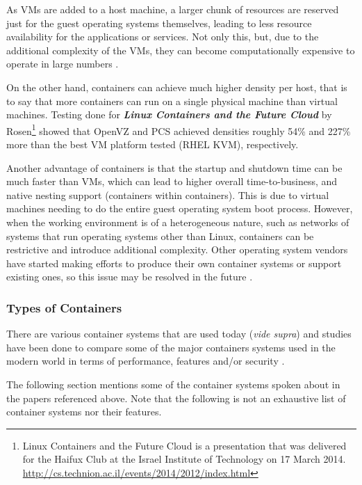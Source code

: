 As VMs are added to a host machine, a larger chunk of resources are reserved just for the guest operating systems themselves, leading to less resource availability for the applications or services. Not only this, but, due to the additional complexity of the VMs, they can become computationally expensive to operate in large numbers \parencite{gupta2015comparison}.

On the other hand, containers can achieve much higher density per host, that is to say that more containers can run on a single physical machine than virtual machines. Testing done for \textbf{\textit{Linux Containers and the Future Cloud}} by Rosen\footnote{Linux Containers and the Future Cloud is a presentation that was delivered for the Haifux Club at the Israel Institute of Technology on 17 March 2014. \url{http://cs.technion.ac.il/events/2014/2012/index.html}} \parencite{rosen2014linux} showed that OpenVZ and PCS achieved densities roughly 54\% and 227\% more than the best VM platform tested (RHEL KVM), respectively. 

Another advantage of containers is that the startup and shutdown time can be much faster than VMs, which can lead to higher overall time-to-business, and native nesting support (containers within containers). This is due to virtual machines needing to do the entire guest operating system boot process. However, when the working environment is of a heterogeneous nature, such as networks of systems that run operating systems other than Linux, containers can be restrictive and introduce additional complexity. Other operating system vendors have started making efforts to produce their own container systems or support existing ones, so this issue may be resolved in the future \parencite{ms_docker}.


\subsubsection{Types of Containers}

There are various container systems that are used today (\textit{vide supra}) and studies have been done to compare some of the major containers systems used in the modern world in terms of performance, features and/or security \parencite{bui2015analysis,gupta2015comparison,xavier2013performance}.

The following section mentions some of the container systems spoken about in the papers referenced above. Note that the following is not an exhaustive list of container systems nor their features.

